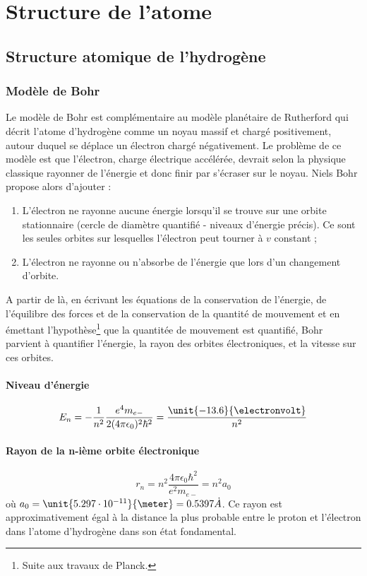 \section{Structure de l'atome}
\subsection{Structure atomique de l'hydrogène}
\subsubsection{Modèle de Bohr}
Le modèle de Bohr est complémentaire au modèle
planétaire de Rutherford qui décrit l'atome d'hydrogène
comme un noyau massif et chargé positivement, autour
duquel se déplace un électron chargé négativement.
Le problème de ce modèle est que l'électron, charge électrique
accélérée, devrait selon la physique classique rayonner
de l'énergie et donc finir par s'écraser sur le noyau.
Niels Bohr propose alors d'ajouter :
\begin{enumerate}
	\item L'électron ne rayonne aucune énergie
	lorsqu'il se trouve sur une orbite stationnaire
	(cercle de diamètre quantifié - niveaux
	d’énergie précis). Ce sont les seules orbites
	sur lesquelles l'électron peut tourner à $v$ constant ;
	\item L'électron ne rayonne ou n’absorbe de
	l’énergie que lors d’un changement d’orbite.
\end{enumerate}
A partir de là, en écrivant les équations
de la conservation de l'énergie, de l'équilibre
des forces et de la conservation de la quantité de
mouvement et en émettant l'hypothèse\footnote{Suite aux
travaux de Planck.} que la quantitée de mouvement est 
quantifié, Bohr parvient à quantifier l'énergie,
la rayon des orbites électroniques, et la vitesse
sur ces orbites.

\paragraph{Niveau d'énergie}
\[E_n = -\frac{1}{n^2}\frac{e^4m_{e-}}{2(4\pi\epsilon_0)^2\hbar^2}
= \frac{\unit{-13.6}{\electronvolt}}{n^2}\]
\paragraph{Rayon de la n-ième orbite électronique}
\[r_n = n^2\frac{4\pi\epsilon_0\hbar^2}{e^2m_{e-}} = n^2a_0\]
où $a_0 = \unit{5.297\cdot10^{-11}}{\meter} = 0.5397\dot{A}$.
Ce rayon est approximativement égal à la distance la plus
probable entre le proton et l'électron dans l'atome
d'hydrogène dans son état fondamental.
